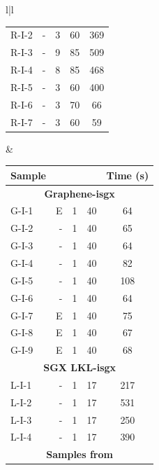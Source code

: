 \begin{table}
\begin{tabular}{l|l}
\begin{minipage}[t]{.45\textwidth}
\begin{threeparttable}[Ht!]
\begin{tabularx}{\columnwidth}{Xrrrc}
					R-I-2  & - & 3  & 60  & 369 \\
					R-I-3  & - & 9  & 85  & 509 \\
					R-I-4  & - & 8  & 85  & 468 \\
					R-I-5  & - & 3  & 60  & 400 \\
					R-I-6  & - & 3  & 70  & 66 \\
					R-I-7\tnote{3}  & - & 3 & 60  & 59 \\
					\midrule
				\end{tabularx}
			\end{threeparttable}
		\end{minipage}
		&
		\begin{minipage}[t]{.45\textwidth}
			\scriptsize
			\centering
			\begin{threeparttable}[Ht!]
				\begin{tabularx}{\columnwidth}{Xrrrc}
					\toprule
					\textbf{Sample\tnote{1}} & 
					\rot{\textbf{Flags\tnote{2}}}&\rot{\textbf{Ecall}}&\rot{\textbf{Ocall}}&
					\textbf{Time (s)}\\
					\midrule
					\multicolumn{5}{c}{\textbf{Graphene-isgx}} \\
					\midrule
					G-I-1  & E & 1  & 40  & 64 \\
					G-I-2  & - & 1  & 40  & 65 \\
					G-I-3  & - & 1  & 40  & 64 \\
					G-I-4  & - & 1  & 40  & 82 \\
					G-I-5  & - & 1  & 40  & 108 \\
					G-I-6  & - & 1  & 40  & 64 \\
					G-I-7  & E & 1  & 40  & 75 \\
					G-I-8  & E & 1  & 40  & 67 \\
					G-I-9  & E & 1  & 40  & 68 \\
					\midrule
					\multicolumn{5}{c}{\textbf{SGX LKL-isgx}} \\
					\midrule
					L-I-1  & - & 1  & 17  & 217 \\
					L-I-2  & - & 1  & 17  & 531 \\
					L-I-3  & - & 1  & 17  & 250 \\
					L-I-4  & - & 1  & 17  & 390 \\
					\midrule
					\multicolumn{5}{c}{\textbf{Samples from \cite{conclave}}} \\
					\midrule

\end{tabularx}
\end{threeparttable}
\end{minipage}
\end{tabular}
\end{table}
